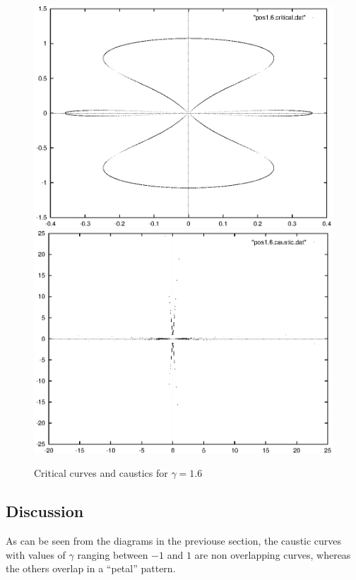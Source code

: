 \documentclass[a4paper]{IEEEtran}
\begin{document}
    \begin{figure} 
        \caption{Critical curves and caustics for $\gamma = 1.6$} 
        \label{fig:critical-gamma1-6} 
        \begin{center}
            \includegraphics[width=\columnwidth]{images/pos1-6-critical.eps} 
            \includegraphics[width=\columnwidth]{images/pos1-6-caustic.eps} 
        \end{center}
    \end{figure}

    \subsection{Discussion}
    As can be seen from the diagrams in the previouse section, 
    the caustic curves with values of $\gamma$ ranging between
    $-1$ and $1$ are non overlapping curves, whereas the others
    overlap in a ``petal'' pattern.
\end{document}
